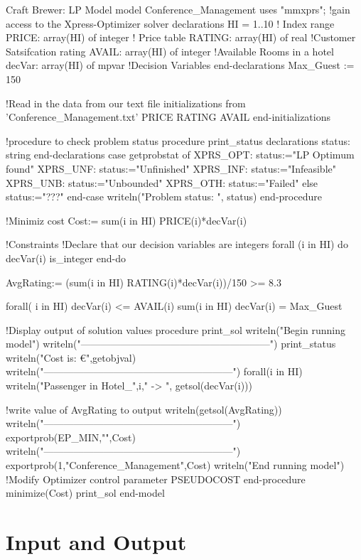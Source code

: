 \documentclass[paper=a4, fontsize=11pt]{scrartcl} %
\begin{document}
\begin{sexylisting}{Craft Brewer: LP Model}
model Conference_Management
uses "mmxprs"; !gain access to the Xpress-Optimizer solver
	declarations
		HI = 1..10                       	! Index range
		PRICE: array(HI) of integer         ! Price table
		RATING: array(HI) of real			!Customer Satsifcation rating
		AVAIL: array(HI) of integer			!Available Rooms in a hotel
		decVar: array(HI) of mpvar          !Decision Variables
	end-declarations
	Max_Guest := 150
	
	!Read in the data from our text file
	initializations from 'Conference_Management.txt'
		PRICE
		RATING
		AVAIL
	end-initializations
	
	!procedure to check problem status
	procedure print_status
		declarations
			status: string
		end-declarations
		case getprobstat of
		XPRS_OPT: status:="LP Optimum found"
		XPRS_UNF: status:="Unfinished"
		XPRS_INF: status:="Infeasible"
		XPRS_UNB: status:="Unbounded"
		XPRS_OTH: status:="Failed"
		else status:="???"
		end-case
		writeln("Problem status: ", status)
	end-procedure
	 
	!Minimiz cost
	Cost:= sum(i in HI) PRICE(i)*decVar(i)
	 
	!Constraints
	!Declare that our decision variables are integers
	forall (i in HI) do 
		decVar(i) is_integer
	end-do
	
	AvgRating:= (sum(i in HI) RATING(i)*decVar(i))/150 >= 8.3
			 
	forall( i in HI)
		decVar(i) <= AVAIL(i)	 	
	sum(i in HI) decVar(i)	= Max_Guest
		
	!Display output of solution values
	procedure print_sol	
		writeln("Begin running model") 	
		writeln("---------------------------------------------------------")
		print_status
		writeln("Cost is: €",getobjval)
		writeln("---------------------------------------------------------")
		forall(i in HI) 
			writeln("Passenger in Hotel_",i," -> ", getsol(decVar(i)))
			
		!write value of AvgRating to output
		writeln(getsol(AvgRating))
		writeln("---------------------------------------------------------")
		exportprob(EP_MIN,"",Cost)
		writeln("---------------------------------------------------------")
		exportprob(1,"Conference_Management",Cost)
		writeln("End running model")
		!Modify Optimizer control parameter PSEUDOCOST
	end-procedure 
	minimize(Cost)
	print_sol	
end-model
\end{sexylisting}
\section{Input and Output}
\end{document}
